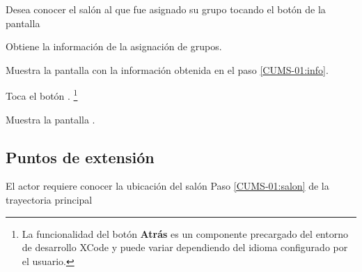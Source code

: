 \begin{UCtrayectoria}
    \UCpaso[\UCactor] Desea conocer el salón al que fue asignado su grupo tocando el botón \botSalones de la pantalla 
    
     \UCpaso[\UCsist] Obtiene la información de la asignación de grupos. \label{CUMS-01:info}
    
    \UCpaso[\UCsist] Muestra la pantalla  con la información obtenida en el paso \ref{CUMS-01:info}. \label{CUMS-01:salon}
    
    \UCpaso[\UCactor] Toca el botón . \footnote{La funcionalidad del botón \textbf{Atrás} es un componente precargado del entorno de desarrollo XCode y puede variar dependiendo del idioma configurado por el usuario.}
    
    \UCpaso[\UCsist] Muestra la pantalla .
    
%    
%    
\end{UCtrayectoria}
%
% 

\subsection{Puntos de extensión}
%
\UCExtensionPoint
{El actor requiere conocer la ubicación del salón}
{ Paso \ref{CUMS-01:salon} de la trayectoria principal}
{}

%
 